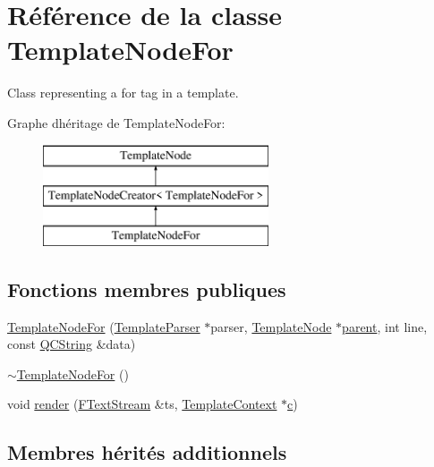 \hypertarget{class_template_node_for}{}\section{Référence de la classe Template\+Node\+For}
\label{class_template_node_for}


Class representing a \textquotesingle{}for\textquotesingle{} tag in a template.  


Graphe d\textquotesingle{}héritage de Template\+Node\+For\+:\begin{figure}[H]
\begin{center}
\leavevmode
\includegraphics[height=3.000000cm]{class_template_node_for}
\end{center}
\end{figure}
\subsection*{Fonctions membres publiques}
\begin{DoxyCompactItemize}
\item 
\hyperlink{class_template_node_for_abd2749f0fe1733845ff5099521066cc6}{Template\+Node\+For} (\hyperlink{class_template_parser}{Template\+Parser} $\ast$parser, \hyperlink{class_template_node}{Template\+Node} $\ast$\hyperlink{class_template_node_a69a306ef84e62af9fe57bf9aacc94536}{parent}, int line, const \hyperlink{class_q_c_string}{Q\+C\+String} \&data)
\item 
\hyperlink{class_template_node_for_ae4f9fa18e6fcb3e9c9334194e650f8b6}{$\sim$\+Template\+Node\+For} ()
\item 
void \hyperlink{class_template_node_for_ad6509478f0188b814451adf3a75c696a}{render} (\hyperlink{class_f_text_stream}{F\+Text\+Stream} \&ts, \hyperlink{class_template_context}{Template\+Context} $\ast$\hyperlink{060__command__switch_8tcl_ab14f56bc3bd7680490ece4ad7815465f}{c})
\end{DoxyCompactItemize}
\subsection*{Membres hérités additionnels}


